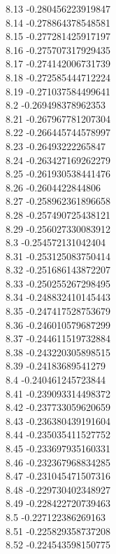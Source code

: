 {8.13	-0.280456223919847\\
8.14	-0.278864378548581\\
8.15	-0.277281425917197\\
8.16	-0.275707317929435\\
8.17	-0.274142006731739\\
8.18	-0.272585444712224\\
8.19	-0.271037584499641\\
8.2	-0.269498378962353\\
8.21	-0.267967781207304\\
8.22	-0.266445744578997\\
8.23	-0.26493222265847\\
8.24	-0.263427169262279\\
8.25	-0.261930538441476\\
8.26	-0.2604422844806\\
8.27	-0.258962361896658\\
8.28	-0.257490725438121\\
8.29	-0.256027330083912\\
8.3	-0.254572131042404\\
8.31	-0.253125083750414\\
8.32	-0.251686143872207\\
8.33	-0.250255267298495\\
8.34	-0.248832410145443\\
8.35	-0.247417528753679\\
8.36	-0.246010579687299\\
8.37	-0.244611519732884\\
8.38	-0.243220305898515\\
8.39	-0.24183689541279\\
8.4	-0.240461245723844\\
8.41	-0.239093314498372\\
8.42	-0.237733059620659\\
8.43	-0.236380439191604\\
8.44	-0.235035411527752\\
8.45	-0.233697935160331\\
8.46	-0.232367968834285\\
8.47	-0.231045471507316\\
8.48	-0.229730402348927\\
8.49	-0.228422720739463\\
8.5	-0.227122386269163\\
8.51	-0.225829358737208\\
8.52	-0.224543598150775\\
}
